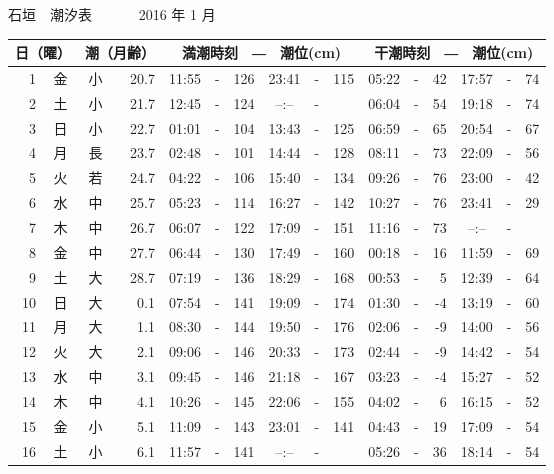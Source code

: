 \documentclass[12pt.a4j]{jsarticle}
\begin{document}
\pagestyle{empty}
 \begin{center}
 {\LARGE 石垣　潮汐表　　　}
 {\large 2016 年  1 月}\\
 \begin{table}[ht]
    \begin{tabular}{|rc|cr|ccrccr|ccrccr|}
    \hline
    \multicolumn{2}{|c|}{日（曜）} & \multicolumn{2}{c|}{潮（月齢）} & \multicolumn{6}{c|}{満潮時刻　―　潮位(cm)} & \multicolumn{6}{c|}{干潮時刻　―　潮位(cm)} \\
 \hline
 1 & 金 & 小 & 20.7 &  11:55 &-& 126  &  23:41 &-& 115  &   05:22 &-&  42  &   17:57 &-&  74  \\
 2 & 土 & 小 & 21.7 &  12:45 &-& 124  &  --:-- &-&     &   06:04 &-&  54  &   19:18 &-&  74  \\
 3 & 日 & 小 & 22.7 &  01:01 &-& 104  &  13:43 &-& 125  &   06:59 &-&  65  &   20:54 &-&  67  \\
 4 & 月 & 長 & 23.7 &  02:48 &-& 101  &  14:44 &-& 128  &   08:11 &-&  73  &   22:09 &-&  56  \\
 5 & 火 & 若 & 24.7 &  04:22 &-& 106  &  15:40 &-& 134  &   09:26 &-&  76  &   23:00 &-&  42  \\
 6 & 水 & 中 & 25.7 &  05:23 &-& 114  &  16:27 &-& 142  &   10:27 &-&  76  &   23:41 &-&  29  \\
 7 & 木 & 中 & 26.7 &  06:07 &-& 122  &  17:09 &-& 151  &   11:16 &-&  73  &   --:-- &-&     \\
 8 & 金 & 中 & 27.7 &  06:44 &-& 130  &  17:49 &-& 160  &   00:18 &-&  16  &   11:59 &-&  69  \\
 9 & 土 & 大 & 28.7 &  07:19 &-& 136  &  18:29 &-& 168  &   00:53 &-&   5  &   12:39 &-&  64  \\
10 & 日 & 大 &  0.1 &  07:54 &-& 141  &  19:09 &-& 174  &   01:30 &-&  -4  &   13:19 &-&  60  \\
11 & 月 & 大 &  1.1 &  08:30 &-& 144  &  19:50 &-& 176  &   02:06 &-&  -9  &   14:00 &-&  56  \\
12 & 火 & 大 &  2.1 &  09:06 &-& 146  &  20:33 &-& 173  &   02:44 &-&  -9  &   14:42 &-&  54  \\
13 & 水 & 中 &  3.1 &  09:45 &-& 146  &  21:18 &-& 167  &   03:23 &-&  -4  &   15:27 &-&  52  \\
14 & 木 & 中 &  4.1 &  10:26 &-& 145  &  22:06 &-& 155  &   04:02 &-&   6  &   16:15 &-&  52  \\
15 & 金 & 小 &  5.1 &  11:09 &-& 143  &  23:01 &-& 141  &   04:43 &-&  19  &   17:09 &-&  54  \\
16 & 土 & 小 &  6.1 &  11:57 &-& 141  &  --:-- &-&     &   05:26 &-&  36  &   18:14 &-&  54  \\

\end{tabular}
\end{table}
\end{center}
\end{document}
